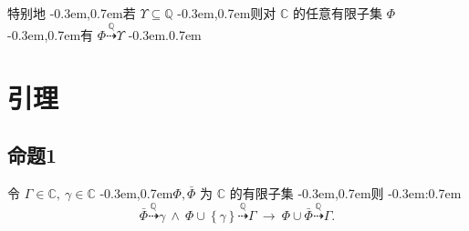 \documentclass{article}
\newcommand\InSetC[1]{\InSet{#1}{\MathSetC}}
\newcommand\MathSetC{\mathbb{C}}
\newcommand\MathSetQ{\mathbb{Q}}
\newcommand\Appose{\Comma}
\newcommand\BracketBig[1]{\left\{ #1 \right\}}
\newcommand\Colon{:}
\newcommand\Comma{,}
\newcommand\CommaAnd{\Space{\Comma}}
\newcommand\Implies{\Logic{\rightarrow}}
\newcommand\InSet[2]{#1 \in #2}
\newcommand\Logic[1]{\ #1\ }
\newcommand\LogicAnd{\Logic{\wedge}}
\newcommand\RationalEx{\stackrel{\MathSetQ}{\dashrightarrow}}
\newcommand\Set[1]{\BracketBig{#1}}
\newcommand\Space[1]{#1\ }
\newcommand\SubSetQ[1]{#1 \subseteq \MathSetQ}
\newcommand\EqEndPeriod{.}
\newcommand\Proposition[1]{命题#1}
\newcommand\TextColon{\TextPunctuation{\Colon}}
\newcommand\TextComma{\TextPunctuation{\Comma}}
\newcommand\TextPeriod{\TextPunctuation{.}}
\newcommand\TextPunctuation[1]{\kern -0.3em#1\kern 0.7em}
\begin{document}
	特别地 \TextComma 若 $\SubSetQ{\Upsilon}$ \TextComma 则对 $\MathSetC$ 的任意有限子集 $\Phi$ \TextComma 有 $\Phi \RationalEx \Upsilon$ \TextPeriod
	
	
	\section{引理} \label{sec:3}
	\subsection{\Proposition{1}} \label{sec:3.1}
	令 $\InSetC{\Gamma} \CommaAnd \InSetC{\gamma}$ \TextComma $\Phi \Appose \bar{\Phi}$ 为 $\MathSetC$ 的有限子集 \TextComma 则 \TextColon
	\begin{equation*}
	\bar{\Phi} \RationalEx \gamma \LogicAnd \Phi \cup \Set{\gamma} \RationalEx \Gamma \Implies \Phi \cup \bar{\Phi} \RationalEx \Gamma \EqEndPeriod
	\end{equation*}
	
\end{document}
